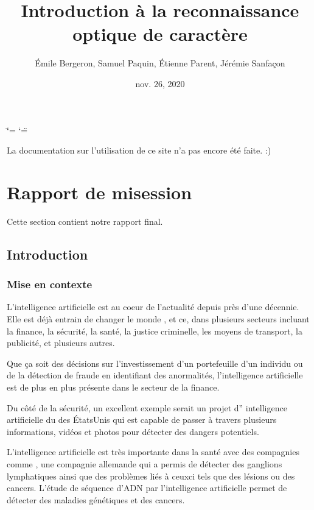 \documentclass[letterpaper,10pt,french]{sphinxmanual}
\title{Introduction à la reconnaissance optique de caractère}
\date{nov. 26, 2020}
\author{Émile Bergeron, Samuel Paquin, Étienne Parent, Jérémie Sanfaçon}
\begin{document}
\ifdefined\shorthandoff
  \ifnum\catcode`\=\string=\active\shorthandoff{=}\fi
  \ifnum\catcode`\"=\active{}\fi
\fi

\pagestyle{empty}
\sphinxmaketitle
\pagestyle{plain}
\sphinxtableofcontents
\pagestyle{normal}
\label{\detokenize{intro::doc}}


La documentation sur l’utilisation de ce site n’a pas encore été faite. :)


\chapter{Rapport de mi\sphinxhyphen{}session}
\label{\detokenize{rapport_final:rapport-de-mi-session}}\label{\detokenize{rapport_final::doc}}
Cette section contient notre rapport final.


\section{Introduction}
\label{\detokenize{intro_finale:introduction}}\label{\detokenize{intro_finale::doc}}

\subsection{Mise en contexte}
\label{\detokenize{intro_finale:mise-en-contexte}}
L’intelligence artificielle est au coeur de l’actualité depuis près d’une
décennie. Elle est déjà entrain de changer le monde , et ce, dans plusieurs
secteurs incluant la finance, la sécurité, la santé, la justice criminelle,
les moyens de transport, la publicité, et plusieurs autres.

Que ça soit des décisions sur l’investissement d’un portefeuille
d’un individu ou de la détection de fraude en identifiant des anormalités, l’intelligence
artificielle est de plus en plus présente dans le secteur de la finance. 

Du côté de la
sécurité, un excellent exemple serait 
un projet d” intelligence artificielle du 
des États\sphinxhyphen{}Unis qui est capable de passer à travers plusieurs informations,
vidéos et photos pour détecter des dangers potentiels.

L’intelligence artificielle est très importante dans la santé avec des compagnies comme
, une compagnie allemande qui a permis de détecter
des ganglions lymphatiques ainsi que des problèmes liés à ceux\sphinxhyphen{}ci tels que des lésions
ou des cancers. L’étude de séquence d’ADN par l’intelligence artificielle permet de détecter
des maladies génétiques et des cancers.
\end{document}
